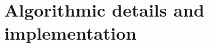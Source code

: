 \documentclass[10pt,a4paper,oneside]{article}
\numberwithin{equation}{section}
\begin{document}
%



\section{Algorithmic details and implementation}
\end{document}
